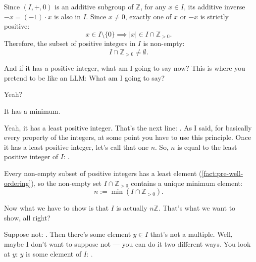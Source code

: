 \begin{proofWrapper}
\begin{content}
Since $(I, +, 0)$ is an additive subgroup of $\mathbb{Z}$, for any $x \in I$, its additive inverse $-x = (-1) \cdot x$ is also in $I$. Since $x \neq 0$, exactly one of $x$ or $-x$ is strictly positive:
\[
x \in I \setminus \{0\} \implies |x| \in I \cap \mathbb{Z}_{>0}.
\]
Therefore, the subset of positive integers in $I$ is non-empty:
\[
I \cap \mathbb{Z}_{>0} \neq \emptyset.
\]
\end{content}

\begin{speech}[00:53:05 - 00:53:19]
And if it has a positive integer, what am I going to say now? This is where you pretend to be like an LLM: What am I going to say?

Yeah?
\end{speech}

\begin{student}
It has a minimum.
\end{student}

\begin{speech}[00:53:19 - 00:53:46]
Yeah, it has a least positive integer. That's the next line: . As I said, for basically every property of the integers, at some point you have to use this principle. Once it has a least positive integer, let's call that one $n$. So, $n$ is equal to the least positive integer of $I$: .
\end{speech}

\begin{content}
Every non-empty subset of positive integers has a least element (\cref{fact:pre-well-ordering}), so the non-empty set $I \cap \mathbb{Z}_{>0}$ contains a unique minimum element:
\begin{equation}\label{eq:n-minimal-pos}
n := \min(I \cap \mathbb{Z}_{>0}).
\end{equation}
\end{content}

\begin{speech}[00:53:46 - 00:54:50]
Now what we have to show is that $I$ is actually $n\mathbb{Z}$. That's what we want to show, all right? 

Suppose not: . Then there's some element $y \in I$ that's not a multiple. Well, maybe I don't want to suppose not --- you can do it two different ways. You look at $y$: $y$ is some element of $I$: .


\end{speech}
\end{proofWrapper}

